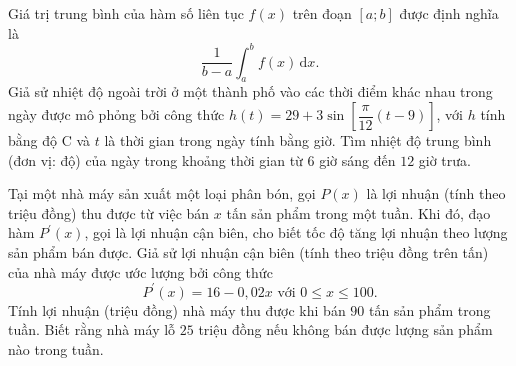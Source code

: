 \begin{ex}%
	Giá trị trung bình của hàm số liên tục $f(x)$ trên đoạn $[a ; b]$ được định nghĩa là
	$$
	\dfrac{1}{b-a} \int_a^b f(x) \mathrm{\,d}x .
	$$
	Giả sử nhiệt độ ngoài trời ở một thành phố vào các thời điểm khác nhau trong ngày được mô phỏng bởi công thức $	h(t)=29+3 \sin \left[\dfrac{\pi}{12}(t-9)\right]$, với $h$ tính bằng độ $\mathrm{C}$ và $t$ là thời gian trong ngày tính bằng giờ.	Tìm nhiệt độ trung bình (đơn vị: độ) của ngày trong khoảng thời gian từ $6$ giờ sáng đến $12$ giờ trưa.
\end{ex}
\begin{ex}%
Tại một nhà máy sản xuất một loại phân bón, gọi $P(x)$ là lợi nhuận (tính theo triệu đồng) thu được từ việc bán $x$ tấn sản phẩm trong một tuần. Khi đó, đạo hàm $P^{\prime}(x)$, gọi là lợi nhuận cận biên, cho biết tốc độ tăng lợi nhuận theo lượng sản phẩm bán được. Giả sử lợi nhuận cận biên (tính theo triệu đồng trên tấn) của nhà máy được ước lượng bởi công thức
$$
P^{\prime}(x)=16-0{,}02 x \text { với } 0 \leq x \leq 100.
$$
Tính lợi nhuận (triệu đồng) nhà máy thu được khi bán $90$ tấn sản phẩm trong tuần. Biết rằng nhà máy lỗ $25$ triệu đồng nếu không bán được lượng sản phẩm nào trong tuần.
\end{ex}

